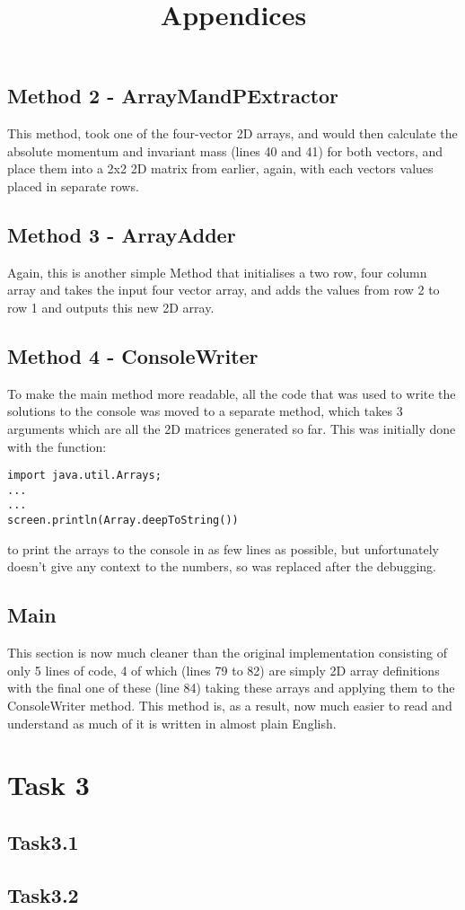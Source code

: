 \documentclass{article}
\begin{document}
\begin{multicols}{2}
			\subsection{Method 2 - ArrayMandPExtractor}
			This method, took one of the four-vector 2D arrays, and would then calculate the absolute momentum and invariant mass (lines 40 and 41) for both vectors, and place them into a 2x2 2D matrix from earlier, again, with each vectors values placed in separate rows.
			\subsection{Method 3 - ArrayAdder}
			Again, this is another simple Method that initialises a two row, four column array and takes the input four vector array, and adds the values from row 2 to row 1 and outputs this new 2D array.
			\subsection{Method 4 - ConsoleWriter}
			To make the main method more readable, all the code that was used to write the solutions to the console was moved to a separate method, which takes 3 arguments which are all the 2D matrices generated so far. This was initially done with the function:
			\begin{lstlisting}
import java.util.Arrays;
...
...
screen.println(Array.deepToString())
			\end{lstlisting}
			to print the arrays to the console in as few lines as possible, but unfortunately doesn't give any context to the numbers, so was replaced after the debugging.
			\subsection{Main}
			This section is now much cleaner than the original implementation consisting of only 5 lines of code, 4 of which (lines 79 to 82) are simply 2D array definitions with the final one of these (line 84) taking these arrays and applying them to the ConsoleWriter method. This method is, as a result, now much easier to read and understand as much of it is written in almost plain English.
	\section{Task 3}
		\subsection{Task3.1}
		\subsection{Task3.2}



\end{multicols}
\newpage


\title{Appendices}
\begin{center}

\begin{lstlisting}

\end{lstlisting}

\end{center}
\end{document}
